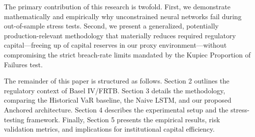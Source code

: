 The primary contribution of this research is twofold. First, we demonstrate mathematically and empirically why unconstrained neural networks fail during out-of-sample stress tests. Second, we present a generalized, potentially production-relevant methodology that materially reduces required regulatory capital---freeing up \capEfficiencyBps{} of capital reserves in our proxy environment---without compromising the strict breach-rate limits mandated by the Kupiec Proportion of Failures test.

The remainder of this paper is structured as follows. Section 2 outlines the regulatory context of Basel IV/FRTB. Section 3 details the methodology, comparing the Historical VaR baseline, the Naive LSTM, and our proposed Anchored architecture. Section 4 describes the experimental setup and the stress-testing framework. Finally, Section 5 presents the empirical results, risk validation metrics, and implications for institutional capital efficiency.